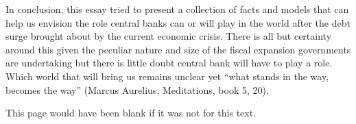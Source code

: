 \documentclass[american]{scrartcl}
\begin{document}
In conclusion, this essay tried to present a collection of facts and models that can help us envision the role central banks can or will play in the world after the debt surge brought about by the current economic crisis. There is all but certainty around this given the peculiar nature and size of the fiscal expansion governments are undertaking but there is little doubt central bank will have to play a role. Which world that will bring us remains unclear yet ``what stands in the way, becomes the way'' (Marcus Aurelius, Meditations, book 5, 20).

\newpage
\printbibliography

\newpage
This page would have been blank if it was not for this text.
\end{document}
